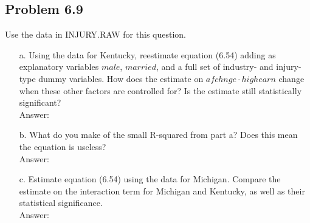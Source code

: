 \documentclass[10pt]{article}
\begin{document}
\subsection*{Problem 6.9}
Use the data in INJURY.RAW for this question. 
\begin{enumerate}
\item[a.] Using the data for Kentucky, reestimate equation (6.54) adding as explanatory variables $male$, $married$, and a full set of industry- and injury-type dummy variables. How does the estimate on $afchnge\cdot highearn$ change when these other factors are controlled for? Is the estimate still statistically significant? 
\\ Answer: \\

\item[b.] What do you make of the small R-squared from part a? Does this mean the equation is useless? 
\\ Answer: \\

\item[c.] Estimate equation (6.54) using the data for Michigan. Compare the estimate on the interaction term for Michigan and Kentucky, as well as their statistical significance.
\\ Answer: \\

\end{enumerate}
\end{document}
